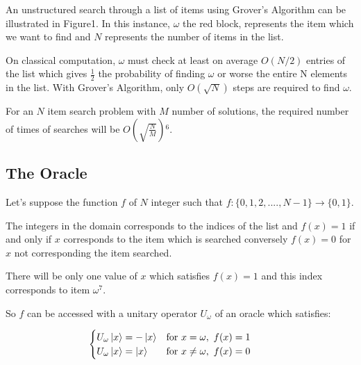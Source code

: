 \documentclass{article}
\begin{document}
\vspace{10mm}
\noindent
An unstructured search through a list of items using Grover's Algorithm can be illustrated in Figure1. In this instance, $\omega$ the red block, represents the item which we want to find and $N$ represents the number of items in the list. 
\vspace{5mm}

\noindent
On classical computation, $\omega$ must check at least on average $O(N/2)$ entries of the list which gives $\frac{1}{2}$ the probability of finding $\omega$ or worse the entire N elements in the list.
With Grover's Algorithm, only $O(\sqrt{N})$ steps are required to find $\omega$.
\vspace{5mm}

\noindent
For an $N$ item search problem with $M$ number of solutions, the required number of times of searches will be $O(\sqrt{\frac{N}{M}})$\hyperlink{6}{$^6$}.
\pagebreak

\subsection{The Oracle}

Let's suppose the function $f$ of $N$ integer such that $f:\{0,1, 2,...., N-1\} \rightarrow{\{0,1\}}$. 
\vspace{5mm}

\noindent
The integers in the domain corresponds to the indices of the list and $f(x) =1$ if and only if $x$ corresponds to the item which is searched conversely $f(x) =0$ for $x$ not corresponding the item searched. 
\vspace{5mm}

\noindent
There will be only one value of $x$ which satisfies $f(x)=1$ and this index corresponds to item $\omega$\hyperlink{7}{$^7$}.
\vspace{5mm}

\noindent
So $f$ can be accessed with a unitary operator $U_{\omega}$ of  an oracle which satisfies:
\vspace{5mm}

$\hspace{30mm} \begin{cases}
      U_{\omega}\ket{x} = -\ket{x}  & \text{for} \ x = \omega, \ f(x) =1 \\
       U_{\omega}\ket{x} = \ket{x}  & \text{for} \ x \neq \omega, \ f(x) = 0 \\
\end{cases}$
\vspace{5mm}
\end{document}
